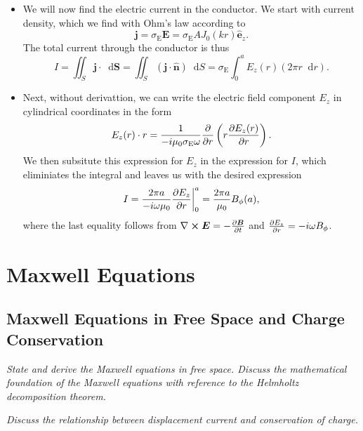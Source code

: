 \documentclass[11pt, a4paper]{article}
\newcommand{\diff}{\mathop{}\!\mathrm{d}} %
\renewcommand{\vec}[1]{\bm{#1}} %
\newcommand{\uvec}[1]{\hat{\vec{#1}}} %
\newcommand{\E}{\vec{E}} %
\newcommand{\B}{\vec{B}} %
\newcommand{\mm}{\mu_{0}}  %
\renewcommand{\j}{\vec{j}}  %
\renewcommand{\curl}{\nabla \cross}
\begin{document}
\begin{itemize}
	\item We will now find the electric current in the conductor. We start with current density, which we find with Ohm's law according to
	\begin{equation*}
		\j = \sigma_{\text{E}}\E = \sigma_{\text{E}}AJ_{0}(kr)\uvec{e}_{z}.
	\end{equation*}
	The total current through the conductor is thus
	\begin{equation*}
		I = \iint_{S} \j \cdot \diff \vec{S} = \iint_{S} (\j \cdot \uvec{n})\diff S = \sigma_{\text{E}} \int_{0}^{a}E_{z}(r)(2\pi r\diff r).
	\end{equation*}
	
	\item Next, without derivattion, we can write the electric field component $ E_{z} $ in cylindrical coordinates in the form
	\begin{equation*}
		E_{z}(r) \cdot r = \frac{1}{-i\mm \sigma_{\text{E}}\omega} \pdv{r}\left(r \pdv{E_{z}(r)}{r}\right).
	\end{equation*}
	We then subsitute this expression for $ E_{z} $ in the expression for $ I $, which eliminiates the integral and leaves us with the desired expression
	\begin{equation*}
		I = \frac{2\pi a}{-i\omega \mm}\pdv{E_{z}}{r}\bigg |_{0}^{a} = \frac{2\pi a}{\mm}B_{\phi}(a),
	\end{equation*}
	where the last equality follows from $ \curl \E = - \pdv{\B}{t} $ and $ \pdv{E_{z}}{r} = -i \omega B_{\phi}$.
	
\end{itemize}
    
\newpage
\section{Maxwell Equations}

\subsection{Maxwell Equations in Free Space and Charge Conservation}
\textit{State and derive the Maxwell equations in free space. Discuss the mathematical foundation of the Maxwell equations with reference to the Helmholtz decomposition theorem.}

\vspace{2mm}
\textit{Discuss the relationship between displacement current and conservation of charge.}
\end{document}
